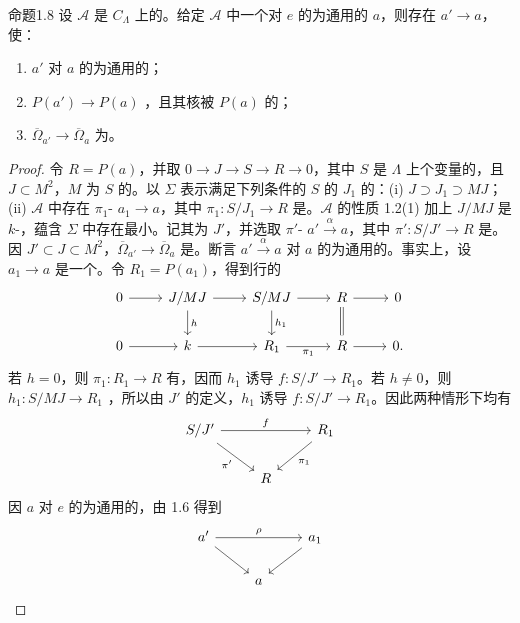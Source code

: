 \begin{SGAresult}{命题}{1.8}
设 $\mathcal A$ 是 $C_\Lambda$ 上的。给定 $\mathcal A$ 中一个对 $e$ 的为通用的 $a$，则存在 $a'\to a$，使：
\begin{enumerate}
\item[(i)] $a'$ 对 $a$ 的为通用的；
\item[(ii)] $P(a')\to P(a)$ ，且其核被 $P(a)$ 的；
\item[(iii)] $\overline\Omega_{a'}\to\overline\Omega_a$ 为。
\end{enumerate}
\end{SGAresult}
\begin{proof}
令 $R=P(a)$，并取 $0\to J\to S\to R\to0$，其中 $S$ 是 $\Lambda$ 上个变量的，且 $J\subset M^2$，$M$ 为 $S$ 的。以 $\Sigma$ 表示满足下列条件的 $S$ 的 $J_1$ 的：(i) $J\supset J_1\supset MJ$；(ii) $\mathcal A$ 中存在 $\pi_1$- $a_1\to a$，其中 $\pi_1:S/J_1\to R$ 是。$\mathcal A$ 的性质 1.2(1) 加上 $J/MJ$ 是 $k$-，蕴含 $\Sigma$ 中存在最小。记其为 $J'$，并选取 $\pi'$- $a'\xrightarrow\alpha a$，其中 $\pi':S/J'\to R$ 是。因 $J'\subset J\subset M^2$，$\overline\Omega_{a'}\to\overline\Omega_a$ 是。断言 $a'\xrightarrow\alpha a$ 对 $a$ 的为通用的。事实上，设 $a_1\to a$ 是一个。令 $R_1=P(a_1)$，得到行的
\[\begin{tikzcd}
0\arrow[r]&J/MJ\arrow[r]\arrow[d,"h"]&S/MJ\arrow[r]\arrow[d,"h_1"]&R\arrow[r]\arrow[d,equal]&0\\
0\arrow[r]&k\arrow[r]&R_1\arrow[r,"\pi_1"']&R\arrow[r]&0.
\end{tikzcd}\]
若 $h=0$，则 $\pi_1:R_1\to R$ 有，因而 $h_1$ 诱导 $f:S/J'\to R_1$。若 $h\ne0$，则 $h_1:S/MJ\to R_1$ ，所以由 $J'$ 的定义，$h_1$ 诱导 $f:S/J'\to R_1$。因此两种情形下均有
\[\begin{tikzcd}S/J'\arrow[rr,"f"]\arrow[dr,"\pi'"']&&R_1\arrow[dl,"\pi_1"]\\&R&\end{tikzcd}\]
因 $a$ 对 $e$ 的为通用的，由 1.6 得到
\[\begin{tikzcd}a'\arrow[rr,"\rho"]\arrow[dr]&&a_1\arrow[dl]\\&a&\end{tikzcd}\]
\end{proof}
